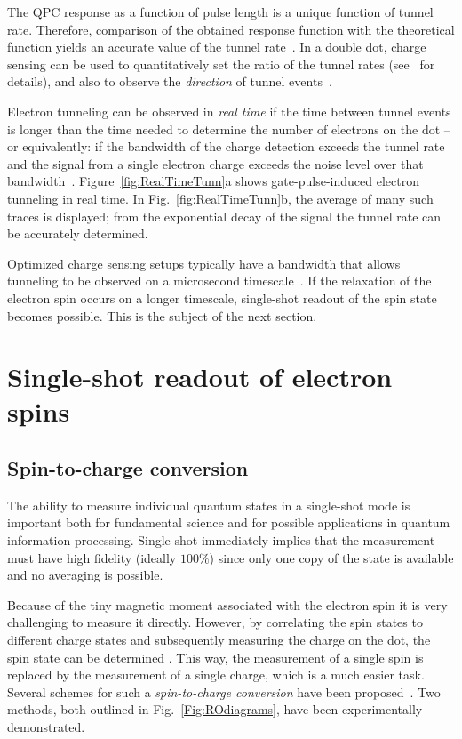 \documentclass[12pt,aps,nofootinbib]{revtex4-1}
\begin{document}
The QPC response as a function of pulse length is a unique function of tunnel rate. Therefore, comparison of the obtained response function with the theoretical function yields an accurate value of the tunnel rate~\cite{ElzermanAPL2004,HansonThesis2005}. In a double dot, charge sensing can be used to quantitatively set the ratio of the tunnel rates (see~\textcite{JohnsonSpinBlock} for details), and also to observe the \textit{direction} of tunnel events~\cite{FujisawaScience2006}.

Electron tunneling can be observed in \textit{real time} if the
time between tunnel events is longer than the time needed to
determine the number of electrons on the dot -- or equivalently:
if the bandwidth of the charge detection exceeds the tunnel rate and the signal from a single electron charge exceeds the noise level over that bandwidth~\cite{Schoelkopf_rfSET,Lu03a}. Figure~\ref{fig:RealTimeTunn}a
shows gate-pulse-induced electron tunneling in real time. In
Fig.~\ref{fig:RealTimeTunn}b, the average of many such traces is
displayed; from the exponential decay of the signal the tunnel
rate can be accurately determined.

Optimized charge sensing setups typically have a bandwidth that
allows tunneling to be observed on a microsecond
timescale~\cite{Lu03a,Fujisawa04a,VandersypenAPL2004,Schleser04}. If the
relaxation of the electron spin occurs on a longer timescale,
single-shot readout of the spin state becomes possible. This is
the subject of the next section.

\section{Single-shot readout of electron spins}
\label{Section:Readout}
\subsection{Spin-to-charge conversion}

The ability to measure individual quantum states in a single-shot mode is important both for fundamental science and for possible applications in quantum information processing. Single-shot immediately implies that the measurement must have high fidelity (ideally $100 \%$) since only one copy of the state is available and no averaging is possible. 

Because of the tiny magnetic moment associated with the electron spin it is very challenging to measure it directly. However, by correlating the spin states to different charge states and subsequently measuring the charge on
the dot, the spin state can be determined \cite{LossDiVincenzo}.
This way, the measurement of a single spin is replaced by the
measurement of a single charge, which is a much easier task.
Several schemes for  such a \textit{spin-to-charge conversion}
have been
proposed~\cite{LossDiVincenzo,KaneNature1998,VandersypenMQC2002,FriesenPRL2004,EngelPRL2004,IonicioiuNJP2005,GreentreePRB2005}.
Two methods, both outlined in Fig.~\ref{Fig:ROdiagrams}, have been
experimentally demonstrated.
\end{document}
